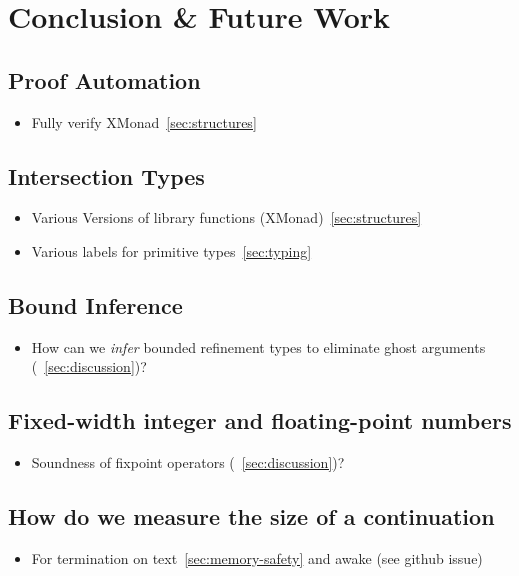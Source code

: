 \chapter{Conclusion \& Future Work}\label{chapter:conclusion}


\section{Proof Automation}\label{future:proofautomation}
\begin{itemize}
\item Fully verify XMonad~\ref{sec:structures}
\end{itemize}

\section{Intersection Types}\label{future:intersection}
\begin{itemize}
\item Various Versions of library functions (XMonad)~\ref{sec:structures}
\item Various labels for primitive types~\ref{sec:typing}
\end{itemize}

\section{Bound Inference}\label{future:ghost}
\begin{itemize}
\item How can we \textit{infer} bounded refinement types
to eliminate ghost arguments (~\ref{sec:discussion})?
\end{itemize}

\section{{Fixed-width integer and floating-point numbers}}\label{future:fp}
\begin{itemize}
\item Soundness of fixpoint operators (~\ref{sec:discussion})?
\end{itemize}


\section{How do we measure the size of a continuation}\label{future:continuations}
\begin{itemize}
\item For termination on text~\ref{sec:memory-safety} and awake (see github issue)
\end{itemize}



